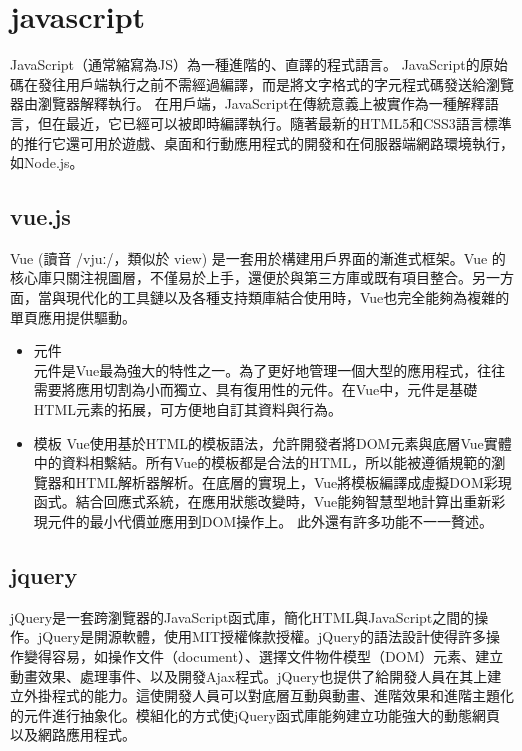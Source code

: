 \section{javascript}
JavaScript（通常縮寫為JS）為一種進階的、直譯的程式語言。
JavaScript的原始碼在發往用戶端執行之前不需經過編譯，而是將文字格式的字元程式碼發送給瀏覽器由瀏覽器解釋執行。
在用戶端，JavaScript在傳統意義上被實作為一種解釋語言，但在最近，它已經可以被即時編譯執行。隨著最新的HTML5和CSS3語言標準的推行它還可用於遊戲、桌面和行動應用程式的開發和在伺服器端網路環境執行，如Node.js。\cite{name11}

\subsection{vue.js}
Vue (讀音 /vjuː/，類似於 view) 是一套用於構建用戶界面的漸進式框架。Vue 的核心庫只關注視圖層，不僅易於上手，還便於與第三方庫或既有項目整合。另一方面，當與現代化的工具鏈以及各種支持類庫結合使用時，Vue也完全能夠為複雜的單頁應用提供驅動。\cite{name12}
\begin{itemize}
	\item 元件\\
	元件是Vue最為強大的特性之一。為了更好地管理一個大型的應用程式，往往需要將應用切割為小而獨立、具有復用性的元件。在Vue中，元件是基礎HTML元素的拓展，可方便地自訂其資料與行為。
	\item 模板
	Vue使用基於HTML的模板語法，允許開發者將DOM元素與底層Vue實體中的資料相繫結。所有Vue的模板都是合法的HTML，所以能被遵循規範的瀏覽器和HTML解析器解析。在底層的實現上，Vue將模板編譯成虛擬DOM彩現函式。結合回應式系統，在應用狀態改變時，Vue能夠智慧型地計算出重新彩現元件的最小代價並應用到DOM操作上。\cite{name13}
	此外還有許多功能不一一贅述。
\end{itemize}

\subsection{jquery}
jQuery是一套跨瀏覽器的JavaScript函式庫，簡化HTML與JavaScript之間的操作。jQuery是開源軟體，使用MIT授權條款授權。jQuery的語法設計使得許多操作變得容易，如操作文件（document）、選擇文件物件模型（DOM）元素、建立動畫效果、處理事件、以及開發Ajax程式。jQuery也提供了給開發人員在其上建立外掛程式的能力。這使開發人員可以對底層互動與動畫、進階效果和進階主題化的元件進行抽象化。模組化的方式使jQuery函式庫能夠建立功能強大的動態網頁以及網路應用程式。\cite{name14}\cite{name15}

